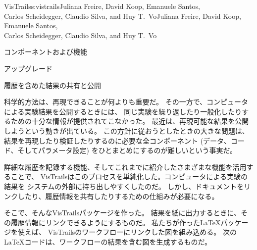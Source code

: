 \begin{aosachaptertoc}{VisTrails}{s:vistrails}{Juliana Freire, David Koop, Emanuele Santos, \\ Carlos Scheidegger, Claudio Silva, and Huy T.\ Vo}{Juliana Freire, David Koop, Emanuele Santos, \\ \hspace*{0.9cm} Carlos Scheidegger, Claudio Silva, and Huy T.\ Vo}
\begin{aosasect1}{コンポーネントおよび機能}
\begin{aosasect2}{アップグレード}
\end{aosasect2}

\begin{aosasect2}{履歴を含めた結果の共有と公開}
\label{sec.vistrails.publish}

科学的方法は、再現できることが何よりも重要だ。
その一方で、コンピュータによる実験結果を公開するときには、
同じ実験を繰り返したり一般化したりするための十分な情報が提供されてこなかった。
最近は、再現可能な結果を公開しようという動きが出ている。
この方針に従おうとしたときの大きな問題は、
結果を再現したり検証したりするのに必要な全コンポーネント
(データ、コード、そしてパラメータ設定)
をひとまとめにするのが難しいという事実だ。

詳細な履歴を記録する機能、そしてこれまでに紹介したさまざまな機能を活用することで、
VisTrailsはこのプロセスを単純化した。コンピュータによる実験の結果を
システムの外部に持ち出しやすくしたのだ。
しかし、ドキュメントをリンクしたり、履歴情報を共有したりするための仕組みが必要になる。

そこで、そんなVisTrailsパッケージを作った。
結果を紙に出力するときに、その履歴情報にリンクできるようにするものだ。
私たちが作ったLaTeXパッケージを使えば、
VisTrailsのワークフローにリンクした図を組み込める。
次のLaTeXコードは、ワークフローの結果を含む図を生成するものだ。


\end{aosasect2}
\end{aosasect1}
\end{aosachaptertoc}
